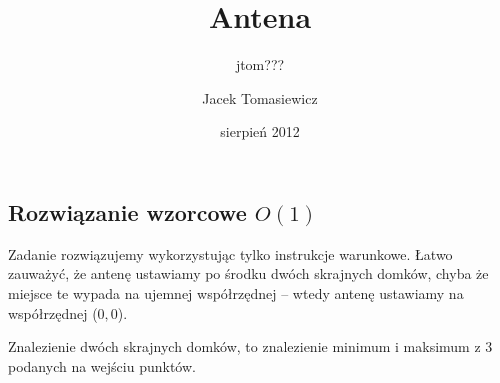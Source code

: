 \documentclass[opr,utf8]{sinol}
\newcounter{def}
\newcounter{tw}
\newcounter{wn}
\newcounter{obs}
\begin{document}
 \signature{jtom???}
  \title{Antena}
  \author{Jacek Tomasiewicz}
  \day{}
  \date{sierpień 2012}


\begin{tasktext}%

\setcounter{def}{1}
\setcounter{tw}{1}
\setcounter{wn}{1}
\setcounter{obs}{1}

\section{Rozwiązanie wzorcowe $O(1)$}

Zadanie rozwiązujemy wykorzystując tylko instrukcje warunkowe. Łatwo zauważyć, że antenę ustawiamy po środku dwóch skrajnych domków, chyba że miejsce te wypada na ujemnej współrzędnej -- wtedy antenę ustawiamy na współrzędnej ($0,0$).

Znalezienie dwóch skrajnych domków, to znalezienie minimum i maksimum z 3 podanych na wejściu punktów.

\end{tasktext}
\end{document}
